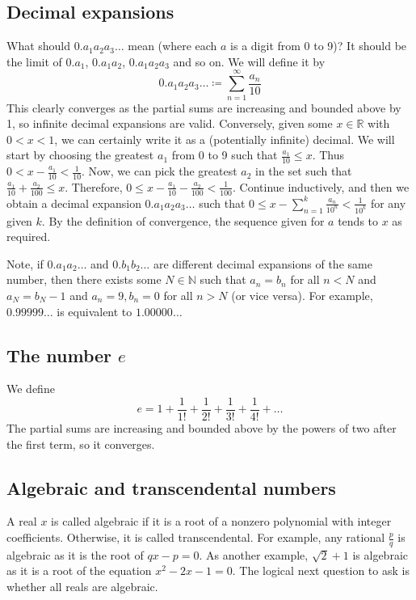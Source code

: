 \subsection{Decimal expansions}
What should \(0.a_1a_2a_3\dots\) mean (where each \(a\) is a digit from 0 to 9)?
It should be the limit of \(0.a_1\), \(0.a_1a_2\), \(0.a_1a_2a_3\) and so on.
We will define it by
\[
	0.a_1a_2a_3\dots \coloneq \sum_{n=1}^\infty \frac{a_n}{10}
\]
This clearly converges as the partial sums are increasing and bounded above by 1, so infinite decimal expansions are valid.
Conversely, given some \(x \in \mathbb R\) with \(0 < x < 1\), we can certainly write it as a (potentially infinite) decimal.
We will start by choosing the greatest \(a_1\) from 0 to 9 such that \(\frac{a_1}{10} \leq x\).
Thus \(0 < x - \frac{a_1}{10} < \frac{1}{10}\).
Now, we can pick the greatest \(a_2\) in the set such that \(\frac{a_1}{10} + \frac{a_2}{100} \leq x\).
Therefore, \(0 \leq x - \frac{a_1}{10} - \frac{a_2}{100} < \frac{1}{100}\).
Continue inductively, and then we obtain a decimal expansion \(0.a_1a_2a_3\dots\) such that \(0 \leq x - \sum_{n=1}^k \frac{a_n}{10^n} < \frac{1}{10^k}\) for any given \(k\).
By the definition of convergence, the sequence given for \(a\) tends to \(x\) as required.

Note, if \(0.a_1a_2\dots\) and \(0.b_1b_2\dots\) are different decimal expansions of the same number, then there exists some \(N \in \mathbb N\) such that \(a_n = b_n\) for all \(n < N\) and \(a_N = b_N - 1\) and \(a_n = 9, b_n = 0\) for all \(n > N\) (or vice versa).
For example, \(0.99999\dots\) is equivalent to \(1.00000\dots\)

\subsection{The number \(e\)}
We define
\[
	e = 1 + \frac{1}{1!} + \frac{1}{2!} + \frac{1}{3!} + \frac{1}{4!} + \dots
\]
The partial sums are increasing and bounded above by the powers of two after the first term, so it converges.

\subsection{Algebraic and transcendental numbers}
A real \(x\) is called algebraic if it is a root of a nonzero polynomial with integer coefficients.
Otherwise, it is called transcendental.
For example, any rational \(\frac{p}{q}\) is algebraic as it is the root of \(qx-p=0\).
As another example, \(\sqrt 2 + 1\) is algebraic as it is a root of the equation \(x^2 - 2x - 1 = 0\).
The logical next question to ask is whether all reals are algebraic.

